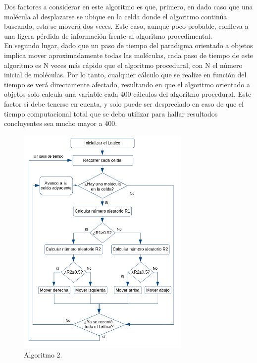\documentclass[12pt,twocolumn]{article}
\begin{document}
Dos factores a considerar en este algoritmo es que, primero, en dado caso que una molécula 
al desplazarse se ubique en la celda donde el algoritmo continúa buscando, esta se moverá 
dos veces. Este caso, aunque poco probable, conlleva a una ligera pérdida de información 
frente al algoritmo procedimental. 
\\

En segundo lugar, dado que un paso de tiempo del paradigma orientado a objetos implica 
mover aproximadamente todas las moléculas, cada paso de tiempo de este algoritmo es N veces 
más rápido que el algoritmo procedural, con N el número inicial de moléculas. Por lo tanto, 
cualquier cálculo que se realize en función del tiempo se verá directamente afectado, 
resultando en que el algoritmo orientado a objetos solo calcula una variable cada 400 
cálculos del algoritmo procedural. Este factor sí debe tenerse en cuenta, y solo puede 
ser despreciado en caso de que el tiempo computacional total que se deba utilizar para 
hallar resultados concluyentes sea mucho mayor a 400.
\\
\begin{figure}
    \centering
    \includegraphics[width=0.75\textwidth]{figs/Algoritmo_OOP.png}
    \caption{Algoritmo 2.}
    \label{fig:algoritmo_OOP}
\end{figure}
\end{document}
